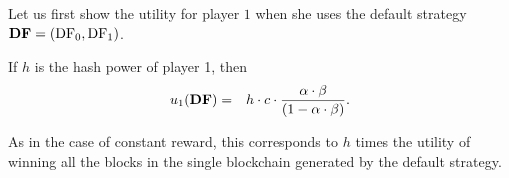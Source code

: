 \documentclass[a4paper,english,cleveref, autoref,numberwithinsect]{lipics-v2019}
\newcommand{\pr}{\mathbf{Pr}}
\newcommand{\bchain}{\text{bc}}
\newcommand{\bQ}{\mathbf{Q}}
\newcommand{\cdf}{\text{\rm {\bf DF}}}
\newcommand{\df}{\text{\rm DF}}
\begin{document}
Let us first show the utility for player $1$ when she uses the default strategy $\cdf = (\df_0,\df_1)$. 

\begin{lemma}\label{lem:default_utility}
If $h$ is the hash power of player 1, then
\begin{eqnarray*}
u_1(\cdf) & = & h\cdot c\cdot\frac{\alpha\cdot\beta}{(1-\alpha\cdot\beta)}.
\end{eqnarray*}
\end{lemma}
As in the case of constant reward, this corresponds to $h$ times the utility of winning all the blocks in the single blockchain generated by the default strategy.

\end{document}
